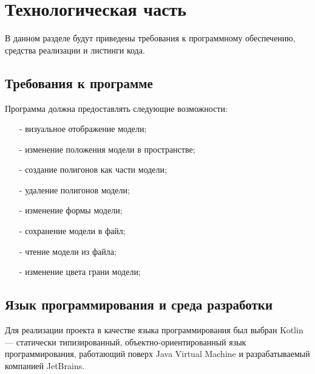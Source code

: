 \chapter{Технологическая часть}

В данном разделе будут приведены требования к программному обеспечению, средства реализации и листинги кода.

\section{Требования к программе}

Программа должна предоставлять следующие возможности:
\begin{itemize}
	\item[-] визуальное отображение модели;
	\item[-] изменение положения модели в пространстве;
	\item[-] создание полигонов как части модели;
	\item[-] удаление полигонов модели;
	\item[-] изменение формы модели;
	\item[-] сохранение модели в файл;
	\item[-] чтение модели из файла;
	\item[-] изменение цвета грани модели;
\end{itemize}

\section{Язык программирования и среда разработки}



Для реализации проекта в качестве языка программирования был выбран Kotlin \cite{kotlin} — статически типизированный, объектно-ориентированный язык программирования, работающий поверх Java Virtual Machine и разрабатываемый компанией JetBrains.



